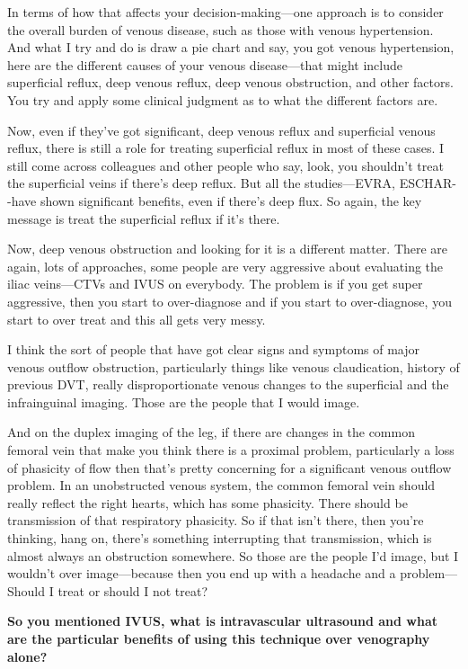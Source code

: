 \documentclass[
]{book}
\begin{document}
In terms of how that affects your decision-making---one approach is to
consider the overall burden of venous disease, such as those with venous
hypertension. And what I try and do is draw a pie chart and say, you got
venous hypertension, here are the different causes of your venous
disease---that might include superficial reflux, deep venous reflux,
deep venous obstruction, and other factors. You try and apply some
clinical judgment as to what the different factors are.

Now, even if they've got significant, deep venous reflux and superficial
venous reflux, there is still a role for treating superficial reflux in
most of these cases. I still come across colleagues and other people who
say, look, you shouldn't treat the superficial veins if there's deep
reflux. But all the studies---EVRA, ESCHAR-\/-have shown significant
benefits, even if there's deep flux.\citep{gohel2007, gohel2018} So again,
the key message is treat the superficial reflux if it's there.

Now, deep venous obstruction and looking for it is a different matter.
There are again, lots of approaches, some people are very aggressive
about evaluating the iliac veins---CTVs and IVUS on everybody. The
problem is if you get super aggressive, then you start to over-diagnose
and if you start to over-diagnose, you start to over treat and this all
gets very messy.

I think the sort of people that have got clear signs and symptoms of
major venous outflow obstruction, particularly things like venous
claudication, history of previous DVT, really disproportionate venous
changes to the superficial and the infrainguinal imaging. Those are the
people that I would image.

And on the duplex imaging of the leg, if there are changes in the common
femoral vein that make you think there is a proximal problem,
particularly a loss of phasicity of flow then that's pretty concerning
for a significant venous outflow problem. In an unobstructed venous
system, the common femoral vein should really reflect the right hearts,
which has some phasicity. There should be transmission of that
respiratory phasicity. So if that isn't there, then you're thinking,
hang on, there's something interrupting that transmission, which is
almost always an obstruction somewhere. So those are the people I'd
image, but I wouldn't over image---because then you end up with a
headache and a problem---Should I treat or should I not treat?

\textbf{So you mentioned IVUS, what is intravascular ultrasound and what are
the particular benefits of using this technique over venography alone?}
\end{document}
